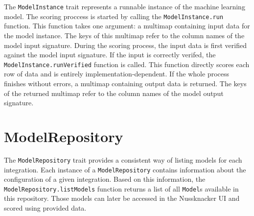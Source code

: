 The \texttt{ModelInstance} trait represents a runnable instance of the machine learning model.
The scoring proccess is started by calling the \texttt{ModelInstance.run} function.
This function takes one argument: a multimap containing input data for the model instance.
The keys of this multimap refer to the column names of the model input signature.
During the scoring process, the input data is first verified against the model input signature.
If the input is correctly verifed, the \texttt{ModelInstance.runVerified} function is called.
This function directly scores each row of data and is entirely implementation-dependent.
If the whole process finishes without errors, a multimap containing output data is returned.
The keys of the returned multimap refer to the column names of the model output signature.

\section {ModelRepository}

The  \texttt{ModelRepository} trait provides a consistent way of listing models for each integration. Each instance of a  \texttt{ModelRepository} contains information about the configuration of a given integration. Based on this information, the \texttt{ModelRepository.listModels} function returns a list of all \texttt{Model}s available in this repository. Those models can later be accessed in the Nussknacker UI and scored using provided data.
